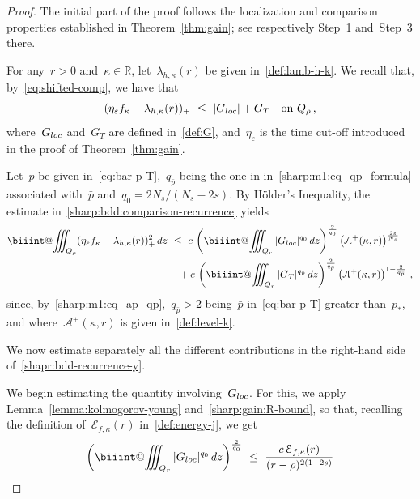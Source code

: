 \documentclass[leqno,10pt]{amsart}
\makeatletter
\theoremstyle{plain}
\theoremstyle{remark}
\numberwithin{equation}{section}
\def\dz{\,{\rm d}z}
\def\er{\mathbb{R}}
\newcommand{\Ac}{\mathcal{A}}
\newcommand{\kk}{\kappa}
\newcommand{\eps}{\varepsilon}
\def\biiint{%
  \mathop{\mathpalette\biiint@{}}\nolimits\!\iiint}
\def\biiint@#1#2{%
  \begingroup
  \setbox0=\hbox{$\m@th#1\iiint$}%
  \dimen@=.81\wd0 %
  \rlap{\hbox to\wd0{%
    \vphantom{\copy0}%
    \hfil$\m@th#1\vcenter{%
      \hrule width\dimen@ height.30pt
    }$\hfil
  }}%
  \endgroup}
\makeatother
\begin{document}
{  \begin{proof}
  The initial part of the proof follows the localization and comparison properties established in Theorem~\ref{thm:gain}; see respectively Step~1 and~Step~3 there.

For any~$r>0$ and~$\kk\in \er$, let~$\lambda_{h,\kk}(r)$ be given in~\eqref{def:lamb-h-k}. We recall
that, by~\eqref{eq:shifted-comp}, we have that 
\begin{equation}\label{sharp:bdd:comparison-recurrence}
(\eta_\eps f_{\kk}-\lambda_{h,\kk}(r))_+ \ \leq \ |G_{\rm loc}|+G_T \quad \text{on}~Q_\rho\,,
\end{equation}
where~$G_{\rm loc}$ and~$G_T$ are defined in~\eqref{def:G}, and~$\eta_\eps$ is the time cut-off introduced in the proof of Theorem~\ref{thm:gain}.

Let~$\bar{p}$ be given in~\eqref{eq:bar-p-T},~$q_{\bar{p}}$ being the one in in~\eqref{sharp:m1:eq_qp_formula} associated with~$\bar{p}$ and~$q_0 = 2N_s/(N_s-2s)$. By H\"older's Inequality, the estimate in~\eqref{sharp:bdd:comparison-recurrence} yields
\begin{equation}\label{shapr:bdd-recurrence-y}
\begin{aligned}
\biiint_{Q_\rho} (\eta_\eps f_{\kk}-\lambda_{h,\kk}(r))_+ ^2\dz & \ \leq \ c\,\left(\biiint_{Q_r}|G_{\rm loc}|^{q_0}\dz\right)^\frac{2}{q_0}\left(\Ac^+(\kk,r)\right)^\frac{2s}{N_s}\\
& \quad + c\,\left(\biiint_{Q_r}|G_{T}|^{q_{\bar{p}}}\dz\right)^\frac{2}{q_{\bar{p}}}\left(\Ac^+(\kk,r)\right)^{1-\frac{2}{q_{\bar{p}}}}\,,
\end{aligned}
\end{equation}
since, by~\eqref{sharp:m1:eq_ap_qp},~$q_{\bar{p}} >2$ being~$\bar{p}$ in~\eqref{eq:bar-p-T} greater than~$p_\ast$, and where~$\Ac^+(\kk,r)$ is given in~\eqref{def:level-k}.

We now estimate separately all the different contributions in the right-hand side of~\eqref{shapr:bdd-recurrence-y}.

\medskip
\noindent
We begin estimating the quantity involving~$G_{\rm loc}$. For this, we apply Lemma~\ref{lemma:kolmogorov-young} and~\eqref{sharp:gain:R-bound}, so that, recalling the definition of~$\mathcal{E}_{f,\kk}(r)$ in~\eqref{def:energy-j}, we get
\begin{equation}\label{eq:source-Gloc}
 \left(\biiint_{Q_r}|G_{\rm loc}|^{q_0}\dz\right)^\frac{2}{q_0}  \ \leq \ \frac{c\,\mathcal{E}_{f,\kk}(r)} {(r-\rho)^{2(1+2s)}}
\end{equation}



\end{proof}}
\end{document}
